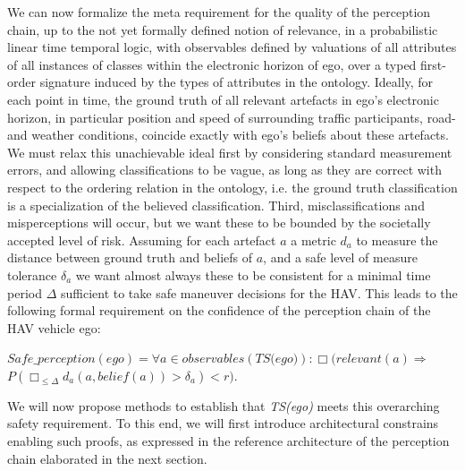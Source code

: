 We can now formalize the meta requirement for the quality of the perception chain, up to the not yet formally defined notion of relevance, in a probabilistic linear time temporal logic, with observables defined by valuations of all attributes of all instances of classes within the electronic horizon of ego, over a typed first-order signature induced by the types of attributes in the ontology. Ideally, for each point in time, the ground truth of all relevant artefacts in ego's electronic horizon, in particular position and speed of surrounding traffic participants, road- and weather conditions, coincide exactly with ego's beliefs about these artefacts. We must relax this unachievable ideal first by considering standard measurement errors, and allowing classifications to be vague, as long as they are correct with respect to the ordering relation in the ontology, i.e. the ground truth classification is a specialization of the believed classification. Third, misclassifications and misperceptions will occur, but we want these to be bounded by the societally accepted level of risk. Assuming for each artefact $a$ a metric $d_a$ to measure the distance between ground truth and beliefs of $a$, and a safe level of measure tolerance $\delta_a$ we want almost always these to be consistent for a minimal time period $\Delta$ sufficient to take safe maneuver decisions for the HAV. This leads to the following formal requirement on the confidence of the perception chain of the HAV vehicle ego:

$\textit{Safe\_perception}(ego) = \forall a \in \textit{observables}(\textit{TS(ego)}):  \Box (\textit{relevant}(a) \Rightarrow$\hfil\\ $P(\Box_{\leq\Delta}d_a(a, \textit{belief}(a))> \delta_a) < r)$.

We will now propose methods to establish that \textit{TS(ego)} meets this overarching safety requirement. To this end, we will first introduce architectural constrains enabling such proofs, as expressed in the reference architecture of the perception chain elaborated in the next section.



